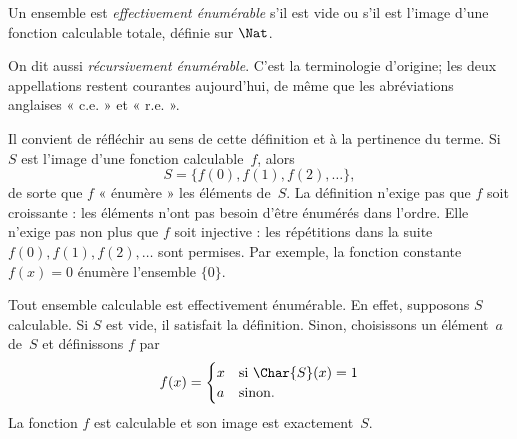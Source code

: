 \documentclass[../../../include/open-logic-section]{subfiles}
\begin{document}

\begin{defn}
Un ensemble est \emph{effectivement énumérable}
s'il est vide ou s'il est l'image d'une fonction
calculable totale, définie sur $\Nat$.
\end{defn}

\begin{history}
On dit aussi \emph{récursivement énumérable}.
C'est la terminologie d'origine; les deux
appellations restent courantes aujourd'hui,
de même que les abréviations anglaises
« c.e. » et « r.e. ».
\end{history}

\begin{explain}
Il convient de réfléchir au sens de cette
définition et à la pertinence du terme.
Si $S$ est l'image d'une fonction
calculable~$f$, alors
\[
S = \{ f(0), f(1), f(2), \dots \},
\]
de sorte que $f$ « énumère » les éléments
de~$S$. La définition n'exige pas que
$f$ soit croissante : les éléments n'ont
pas besoin d'être énumérés dans l'ordre.
Elle n'exige pas non plus que $f$ soit
injective : les répétitions dans la
suite $f(0),f(1),f(2),\dots{}$ sont permises.
Par exemple, la fonction constante
$f(x)=0$ énumère l'ensemble $\{0\}$.
\end{explain}

Tout ensemble calculable est effectivement
énumérable. En effet, supposons $S$
calculable. Si $S$ est vide, il satisfait
la définition. Sinon, choisissons un
élément~$a$ de~$S$ et définissons
$f$ par
\[
f(x) =
\begin{cases}
x & \text{si $\Char{S}(x)=1$}\\
a & \text{sinon.}
\end{cases}
\]
La fonction $f$ est calculable et son
image est exactement~$S$.
\end{document}

